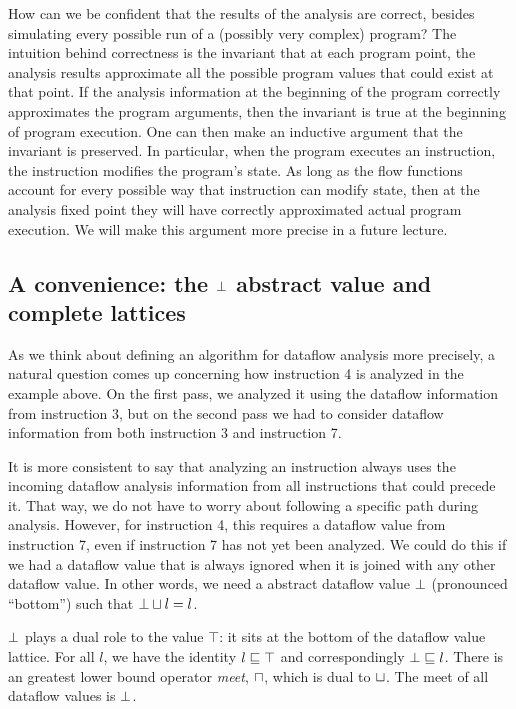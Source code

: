 \documentclass[11pt]{article}
\begin{document}
How can we be confident that the results of the analysis are correct, besides
simulating every possible run of a (possibly very complex) program? The
intuition behind correctness is the invariant that at each program point, the
analysis results approximate all the possible program values that could exist at
that point.  If the analysis information at the beginning of the program
correctly approximates the program arguments, then the invariant is true at the
beginning of program execution.  One can then make an inductive argument that
the invariant is preserved.  In particular, when the
program executes an instruction, the instruction modifies the program's state.
As long as the flow functions account for every possible way that instruction
can modify state, then at the analysis fixed point they will have
correctly approximated actual program execution. 
We will make this argument more precise in a future lecture.


\subsection{A convenience: the $\bot$ abstract value and complete lattices}

As we think about defining an algorithm for dataflow analysis more precisely, a
natural question comes up concerning how instruction 4 is analyzed in the
example above.  On the first pass, we analyzed it using the dataflow information
from instruction 3, but on the second pass we had to consider dataflow
information from both instruction 3 and instruction 7.

It is more consistent to say that analyzing an instruction always uses the
incoming dataflow analysis information from all instructions that could precede
it.  That way, we do not have to worry about following a specific
path during analysis.  However, for instruction 4, this requires a dataflow value from
instruction 7, even if instruction 7 has not yet been analyzed.  We
could do this if we had a dataflow value that is always ignored when it is
joined with any other dataflow value.  In other words, we need a abstract
dataflow value $\bot$ (pronounced ``bottom'') such that $\bot \sqcup l =
l$.

$\bot$ plays a dual role to the value $\top$: it sits at the bottom of the
dataflow value lattice.  For all $l$, we have the identity $l \sqsubseteq \top$ and
correspondingly $\bot \sqsubseteq l$.  There is an greatest lower bound operator
\textit{meet}, $\sqcap$, which is dual to $\sqcup$.  The meet of all dataflow
values is $\bot$.
\end{document}
